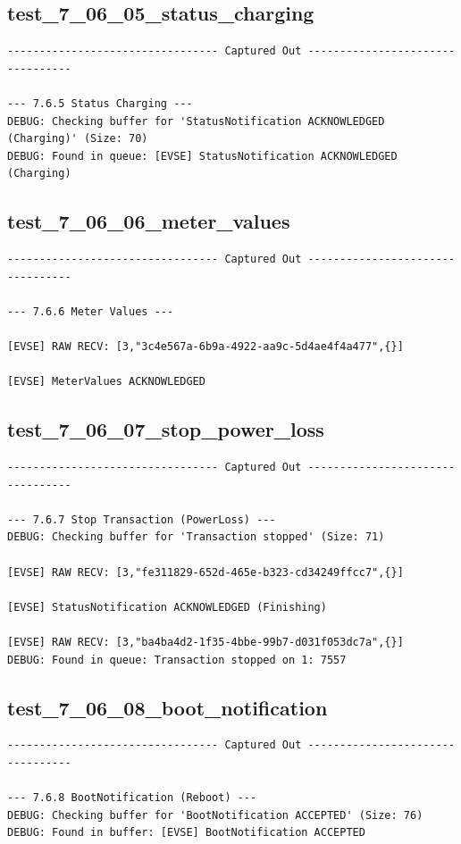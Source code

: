 \documentclass{article}
\begin{document}
\subsection*{test\_7\_06\_05\_status\_charging}
\begin{lstlisting}
--------------------------------- Captured Out ---------------------------------

--- 7.6.5 Status Charging ---
DEBUG: Checking buffer for 'StatusNotification ACKNOWLEDGED (Charging)' (Size: 70)
DEBUG: Found in queue: [EVSE] StatusNotification ACKNOWLEDGED (Charging)
\end{lstlisting}
\subsection*{test\_7\_06\_06\_meter\_values}
\begin{lstlisting}
--------------------------------- Captured Out ---------------------------------

--- 7.6.6 Meter Values ---

[EVSE] RAW RECV: [3,"3c4e567a-6b9a-4922-aa9c-5d4ae4f4a477",{}]

[EVSE] MeterValues ACKNOWLEDGED
\end{lstlisting}
\subsection*{test\_7\_06\_07\_stop\_power\_loss}
\begin{lstlisting}
--------------------------------- Captured Out ---------------------------------

--- 7.6.7 Stop Transaction (PowerLoss) ---
DEBUG: Checking buffer for 'Transaction stopped' (Size: 71)

[EVSE] RAW RECV: [3,"fe311829-652d-465e-b323-cd34249ffcc7",{}]

[EVSE] StatusNotification ACKNOWLEDGED (Finishing)

[EVSE] RAW RECV: [3,"ba4ba4d2-1f35-4bbe-99b7-d031f053dc7a",{}]
DEBUG: Found in queue: Transaction stopped on 1: 7557
\end{lstlisting}
\subsection*{test\_7\_06\_08\_boot\_notification}
\begin{lstlisting}
--------------------------------- Captured Out ---------------------------------

--- 7.6.8 BootNotification (Reboot) ---
DEBUG: Checking buffer for 'BootNotification ACCEPTED' (Size: 76)
DEBUG: Found in buffer: [EVSE] BootNotification ACCEPTED
\end{lstlisting}
\end{document}
